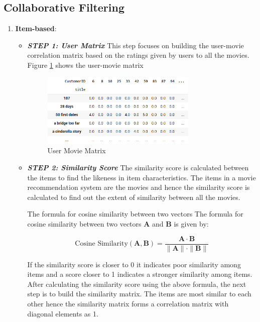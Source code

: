 \documentclass[a4paper,10pt]{article}
\begin{document}
\subsection{Collaborative Filtering}

\begin{enumerate}
    \item \textbf{Item-based}: 
    \vspace{2pt}
    \begin{itemize}
        \item  \textbf{\textit{STEP 1: User Matrix}}
        \vspace{2pt}
        This step focuses on building the user-movie correlation matrix based on the ratings given by users to all the movies. Figure \ref{user_movie} shows the user-movie matrix 

\begin{figure}[H]
    
        \centering
        \includegraphics[height=3.5cm]{figures/user_movie.png}
        \caption{User Movie Matrix}
        \label{user_movie}
        
\end{figure}
 
    \item  \textbf{\textit{STEP 2: Similarity Score }} 
        The similarity score is calculated between the items to find the likeness in item characteristics. The items in a movie recommendation system are the movies and hence the similarity score is calculated to find out the extent of similarity between all the movies.

        The formula for cosine similarity between two vectors
The formula for cosine similarity between two vectors $\mathbf{A}$ and $\mathbf{B}$ is given by:

\[
\text{Cosine Similarity}(\mathbf{A}, \mathbf{B}) = \frac{\mathbf{A} \cdot \mathbf{B}}{\|\mathbf{A}\| \cdot \|\mathbf{B}\|}
\]


If the similarity score is closer to 0 it indicates poor similarity among items and a score closer to 1 indicates a stronger similarity among items. After calculating the similarity score using the above formula, the next step is to build the similarity matrix. 
The items are most similar to each other hence the similarity matrix forms a correlation matrix with diagonal elements as 1.


\end{itemize}
\end{enumerate}
\end{document}
